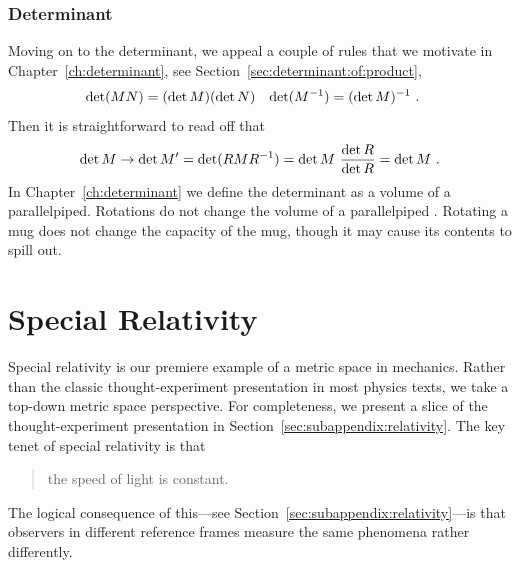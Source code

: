 \documentclass[12pt, oneside]{report}    %
\begin{document}
\begin{subappendices}
\subsection{Determinant}

Moving on to the determinant, we appeal a couple of rules that we motivate in Chapter~\ref{ch:determinant}, see Section~\ref{sec:determinant:of:product},
\begin{align}
    \det(MN) &= (\det M)(\det N)
    &
    \det(M^{-1} ) &= (\det M)^{-1}  \ .
\end{align}
Then it is straightforward to read off that
\begin{align}
    \det M \to \det M' = \det(RMR^{-1} ) = \det M\ \frac{\det R}{\det R} = \det M \ .
\end{align}
In Chapter~\ref{ch:determinant} we define the determinant as a volume of a parallelpiped. Rotations do not change the volume of a parallelpiped . Rotating a mug does not change the capacity of the mug, though it may cause its contents to spill out. 

\end{subappendices}




\chapter{Special Relativity}

Special relativity is our premiere example of a metric space in mechanics. Rather than the classic thought-experiment presentation in most physics texts, we take a top-down metric space perspective. For completeness, we present a slice of the thought-experiment presentation in Section~\ref{sec:subappendix:relativity}. The key tenet of special relativity is that 
\begin{quote}
the speed of light is constant.
\end{quote}
The logical consequence of this---see Section~\ref{sec:subappendix:relativity}---is that observers in different reference frames measure the same phenomena rather differently.
\end{document}
